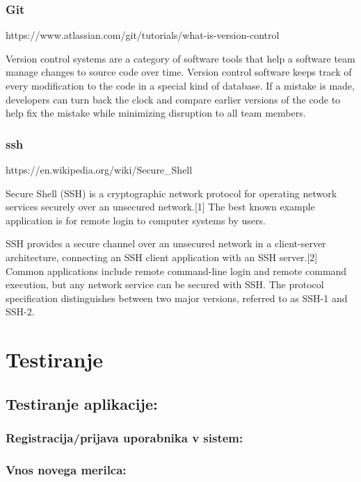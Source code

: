 \documentclass[12pt,a4paper,titlepage,openany]{report}
\begin{document}
\subsection{Git}

https://www.atlassian.com/git/tutorials/what-is-version-control



Version control systems are a category of software tools that help a software team manage changes to source code over time. Version control software keeps track of every modification to the code in a special kind of database. If a mistake is made, developers can turn back the clock and compare earlier versions of the code to help fix the mistake while minimizing disruption to all team members.

\subsection{ssh}
https://en.wikipedia.org/wiki/Secure\_Shell

Secure Shell (SSH) is a cryptographic network protocol for operating network services securely over an unsecured network.[1] The best known example application is for remote login to computer systems by users.

SSH provides a secure channel over an unsecured network in a client-server architecture, connecting an SSH client application with an SSH server.[2] Common applications include remote command-line login and remote command execution, but any network service can be secured with SSH. The protocol specification distinguishes between two major versions, referred to as SSH-1 and SSH-2.

\chapter{Testiranje}
\thispagestyle{fancy}


\section{Testiranje aplikacije:}
\thispagestyle{fancy}


\subsection{Registracija/prijava uporabnika v sistem:}
\subsection{Vnos novega merilca:}
\end{document}
